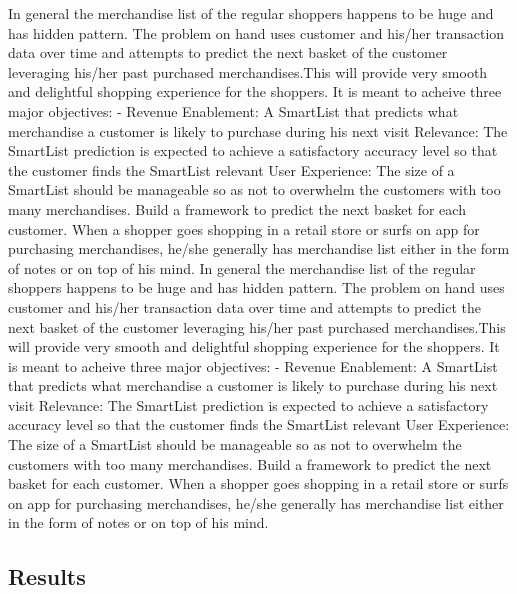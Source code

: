 In general the merchandise list of the regular shoppers happens to be huge and has hidden pattern. 
The problem on hand uses customer and his/her transaction data over time and attempts to predict 
the next basket of the customer leveraging his/her past purchased merchandises.This will provide 
very smooth and delightful shopping experience for the shoppers. It is meant to acheive three major 
objectives: - Revenue Enablement: A SmartList that predicts what merchandise a customer is likely to 
purchase during his next visit Relevance: The SmartList prediction is expected to achieve a 
satisfactory accuracy level so that the customer finds the SmartList relevant User Experience: 
The size of a SmartList should be manageable so as not to overwhelm the customers with too many 
merchandises. Build a framework to predict the next basket for each customer.
When a shopper goes shopping in a retail store or surfs on app for purchasing merchandises, 
he/she generally has merchandise list either in the form of notes or on top of his mind. 
In general the merchandise list of the regular shoppers happens to be huge and has hidden pattern. 
The problem on hand uses customer and his/her transaction data over time and attempts to predict 
the next basket of the customer leveraging his/her past purchased merchandises.This will provide 
very smooth and delightful shopping experience for the shoppers. It is meant to acheive three major 
objectives: - Revenue Enablement: A SmartList that predicts what merchandise a customer is likely to 
purchase during his next visit Relevance: The SmartList prediction is expected to achieve a 
satisfactory accuracy level so that the customer finds the SmartList relevant User Experience: 
The size of a SmartList should be manageable so as not to overwhelm the customers with too many 
merchandises. Build a framework to predict the next basket for each customer.
When a shopper goes shopping in a retail store or surfs on app for purchasing merchandises, 
he/she generally has merchandise list either in the form of notes or on top of his mind. 

\subsection{Results}

